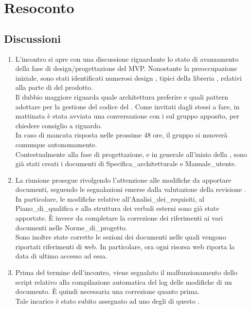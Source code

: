 \section{Resoconto} \label{sec:resoconto}
\subsection{Discussioni} \label{subsec:resdiscussione}
\begin{enumerate}
    \item L'incontro si apre con una discussione riguardante lo stato di avanzamento della fase di design/progettazione del MVP. Nonostante la preoccupazione iniziale, sono stati identificati numerosi design , tipici della libreria , relativi alla parte di  del prodotto.\\
    Il dubbio maggiore riguarda quale architettura preferire e quali pattern adottare per la gestione del codice del . Come invitati dagli stessi a fare, in mattinata è stata avviata una conversazione con i  sul gruppo  apposito, per chiedere consiglio a riguardo.\\
    In caso di mancata risposta nelle prossime 48 ore, il gruppo si muoverà comunque autonomamente.\\
    Contestualmente alla fase di progettazione, e in generale all'inizio della , sono già stati creati i documenti di Specifica\_architetturale e Manuale\_utente.
    \item La riunione prosegue rivolgendo l'attenzione alle modifiche da apportare  documenti, seguendo le segnalazioni emerse dalla valutazione della revisione . In particolare, le modifiche relative all'Analisi\_dei\_requisiti, al Piano\_di\_qualifica e alla struttura dei verbali esterni sono già state apportate. È invece da completare la correzione dei riferimenti ai vari documenti nelle Norme\_di\_progetto.\\
    Sono inoltre state corrette le sezioni dei documenti nelle quali vengono riportati riferimenti di  web. In particolare, ora ogni risorsa web riporta la data di ultimo accesso ad essa.
    \item Prima del termine dell'incontro, viene segnalato il malfunzionamento dello script relativo alla compilazione automatica del log delle modifiche di un documento. È quindi necessaria una correzione quanto prima.\\
    Tale incarico è stato subito assegnato ad uno degli  di questo .
\end{enumerate}

